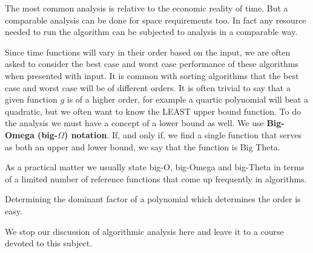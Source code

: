 The most common analysis is relative to the economic reality of time. But a comparable analysis can be done for space requirements too. In fact any resource needed to run the algorithm can be subjected to analysis in a comparable way.

Since time functions will vary in their order based on the input, we are often asked to consider the best case and worst case performance of these algorithms when presented with input. It is common with sorting algorithms that the best case and worst case will be of different orders. It is often trivial to say that a given function $g$ is of a higher order, for example a quartic polynomial will beat a quadratic, but we often want to know the LEAST upper bound function. To do the analysis we must have a concept of a lower bound as well. We use \textbf{Big-Omega (big-$\Omega$) notation}. If, and only if, we find a single function that serves as both an upper and lower bound, we say that the function is Big Theta.


As a practical matter we usually state big-O, big-Omega and big-Theta in terms of a limited number of reference functions that come up  frequently in algorithms.

Determining the dominant factor of a polynomial which determines the order is easy.

We stop our discussion of algorithmic analysis here and leave it to a course devoted to this subject.
\newpage




